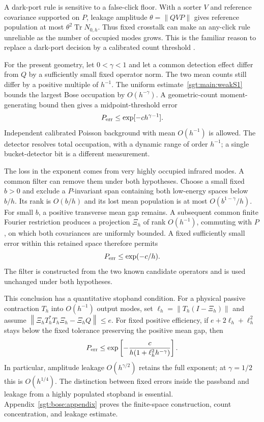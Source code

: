 \documentclass[aps,pra,reprint,superscriptaddress,longbibliography]{revtex4-2}
\newcommand{\Tr}{\operatorname{Tr}}
\newcommand{\norm}[1]{\left\lVert#1\right\rVert}
\begin{document}
A dark-port rule is sensitive to a false-click floor. With a sorter $V$
and reference covariance supported on $P$, leakage amplitude
$\theta=\norm{QVP}$ gives reference population at most
$\theta^2\Tr N_{0,h}$. Thus fixed crosstalk can make an any-click rule
unreliable as the number of occupied modes grows. This is the familiar
reason to replace a dark-port decision by a calibrated count threshold
\cite{Schlichtholz2024}.

For the present geometry, let $0<\gamma<1$ and let a common detection
effect differ from $Q$ by a sufficiently small fixed operator norm.
The two mean counts still differ by a positive multiple of $h^{-1}$.
The uniform estimate~\eqref{sgt:main:weakS1} bounds the largest Bose
occupation by $O(h^{-\gamma})$. A geometric-count moment-generating
bound then gives a midpoint-threshold error
\begin{equation}
 P_{\rm err}\le \exp[-c h^{\gamma-1}].
 \label{sgt:main:threshold}
\end{equation}
Independent calibrated Poisson background with mean $O(h^{-1})$
is allowed. The detector resolves total occupation, with a dynamic
range of order $h^{-1}$; a single bucket-detector bit is a different
measurement.

The loss in the exponent comes from very highly occupied infrared
modes. A common filter can remove them under both hypotheses. Choose
a small fixed $b>0$ and exclude a $P$-invariant span containing both
low-energy spaces below $b/h$. Its rank is $O(b/h)$ and its lost mean
population is at most $O(b^{1-\gamma}/h)$. For small $b$, a positive
transverse mean gap remains. A subsequent common finite Fourier
restriction produces a projection $\Xi_h$ of rank $O(h^{-1})$,
commuting with $P$, on which both covariances are uniformly bounded.
A fixed sufficiently small error within this retained space therefore
permits
\begin{equation}
 P_{\rm err}\le\exp(-c/h).
 \label{sgt:main:filtered}
\end{equation}
The filter is constructed from the two known candidate operators and
is used unchanged under both hypotheses.

This conclusion has a quantitative stopband condition. For a physical
passive contraction $T_h$ into $O(h^{-1})$ output modes, set
$\ell_h=\norm{T_h(I-\Xi_h)}$ and assume
$\norm{\Xi_hT_h^*T_h\Xi_h-\Xi_hQ}\le e$.
For fixed positive efficiency, if $e+2\ell_h+\ell_h^2$ stays below
the fixed tolerance preserving the positive mean gap, then
\begin{equation}
 P_{\rm err}\le
 \exp\left[-\frac{c}{h(1+\ell_h^2h^{-\gamma})}\right].
 \label{sgt:main:leakage}
\end{equation}
In particular, amplitude leakage $O(h^{\gamma/2})$ retains the full
exponent; at $\gamma=1/2$ this is $O(h^{1/4})$. The distinction between
fixed errors inside the passband and leakage from a highly populated
stopband is essential. Appendix~\ref{sgt:bose:appendix} proves the
finite-space construction, count concentration, and leakage estimate.
\end{document}
